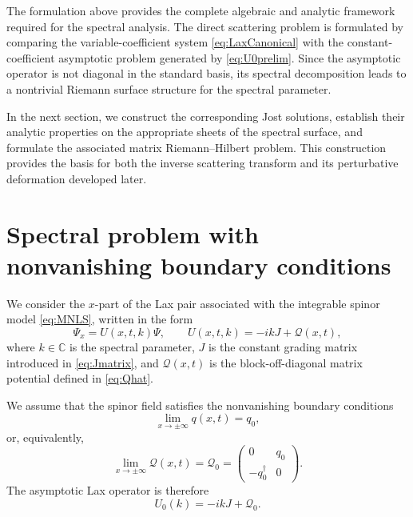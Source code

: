 \documentclass[11pt]{amsart}
\theoremstyle{definition}
\numberwithin{equation}{section}
\begin{document}
The formulation above provides the complete algebraic and analytic framework required for the spectral analysis. The direct scattering problem is formulated by comparing the variable-coefficient system \eqref{eq:LaxCanonical} with the constant-coefficient asymptotic problem generated by \eqref{eq:U0prelim}. Since the asymptotic operator is not diagonal in the standard basis, its spectral decomposition leads to a nontrivial Riemann surface structure for the spectral parameter.

In the next section, we construct the corresponding Jost solutions, establish their analytic properties on the appropriate sheets of the spectral surface, and formulate the associated matrix Riemann--Hilbert problem. This construction provides the basis for both the inverse scattering transform and its perturbative deformation developed later.

\section{Spectral problem with nonvanishing boundary conditions}
\label{NVBC_spinor2}

We consider the $x$-part of the Lax pair associated with the integrable spinor model \eqref{eq:MNLS}, written in the form
\begin{equation}
\Psi_x = U(x,t,k)\Psi, 
\qquad 
U(x,t,k) = -ikJ + \mathcal Q(x,t),
\label{eq:LaxU2}
\end{equation}
where $k \in \mathbb{C}$ is the spectral parameter, $J$ is the constant grading matrix introduced in \eqref{eq:Jmatrix}, and $\mathcal Q(x,t)$ is the block-off-diagonal matrix potential defined in \eqref{eq:Qhat}.

We assume that the spinor field satisfies the nonvanishing boundary conditions
\begin{equation}
\lim_{x \to \pm\infty} q(x,t) = q_0,
\label{eq:BC_q0_2}
\end{equation}
or, equivalently,
\begin{equation}
\lim_{x \to \pm\infty} \mathcal Q(x,t) = \mathcal Q_0
=
\begin{pmatrix}
0 & q_0 \\
-q_0^\dagger & 0
\end{pmatrix}.
\label{eq:BC_Qhat0_2}
\end{equation}
The asymptotic Lax operator is therefore
\begin{equation}
U_0(k) = -ikJ + \mathcal Q_0.
\label{eq:U0_2}
\end{equation}
\end{document}
